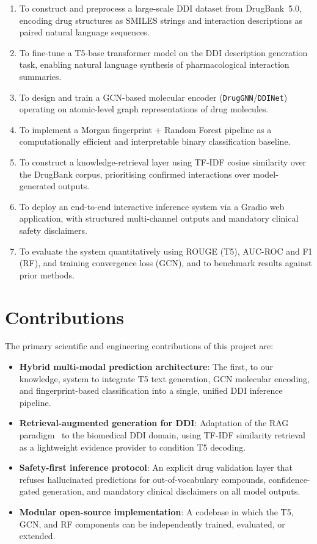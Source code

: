 \documentclass[12pt,a4paper,oneside]{report}
\begin{document}
\begin{enumerate}
  \item To construct and preprocess a large-scale DDI dataset from DrugBank~5.0, encoding
  drug structures as SMILES strings and interaction descriptions as paired natural language
  sequences.
  \item To fine-tune a T5-base transformer model on the DDI description generation task,
  enabling natural language synthesis of pharmacological interaction summaries.
  \item To design and train a GCN-based molecular encoder (\texttt{DrugGNN}/\texttt{DDINet})
  operating on atomic-level graph representations of drug molecules.
  \item To implement a Morgan fingerprint + Random Forest pipeline as a computationally
  efficient and interpretable binary classification baseline.
  \item To construct a knowledge-retrieval layer using TF-IDF cosine similarity over the
  DrugBank corpus, prioritising confirmed interactions over model-generated outputs.
  \item To deploy an end-to-end interactive inference system via a Gradio web application,
  with structured multi-channel outputs and mandatory clinical safety disclaimers.
  \item To evaluate the system quantitatively using ROUGE (T5), AUC-ROC and F1 (RF), and
  training convergence loss (GCN), and to benchmark results against prior methods.
\end{enumerate}

\section{Contributions}

The primary scientific and engineering contributions of this project are:

\begin{itemize}
  \item \textbf{Hybrid multi-modal prediction architecture}: The first, to our knowledge,
  system to integrate T5 text generation, GCN molecular encoding, and fingerprint-based
  classification into a single, unified DDI inference pipeline.
  \item \textbf{Retrieval-augmented generation for DDI}: Adaptation of the RAG
  paradigm~\cite{lewis2020retrieval} to the biomedical DDI domain, using TF-IDF similarity
  retrieval as a lightweight evidence provider to condition T5 decoding.
  \item \textbf{Safety-first inference protocol}: An explicit drug validation layer that
  refuses hallucinated predictions for out-of-vocabulary compounds, confidence-gated
  generation, and mandatory clinical disclaimers on all model outputs.
  \item \textbf{Modular open-source implementation}: A codebase in which the T5, GCN, and
  RF components can be independently trained, evaluated, or extended.
\end{itemize}
\end{document}
